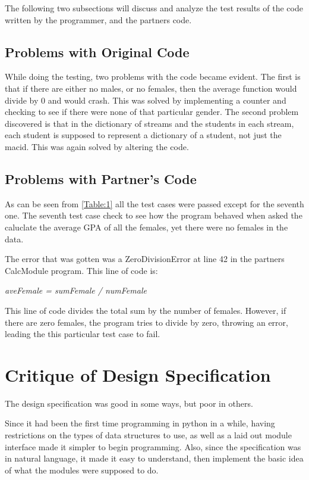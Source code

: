 \documentclass[12pt]{article}
\begin{document}
The following two subsections will discuss and analyze the test results of the code
written by the programmer, and the partners code.

\subsection{Problems with Original Code}

While doing the testing, two problems with the code became evident. The first is that
if there are either no males, or no females, then the average function would divide by 0
and would crash. This was solved by implementing a counter and checking to see if there were
none of that particular gender. The second problem discovered is that in the dictionary of streams
and the students in each stream, each student is supposed to represent a dictionary of a student,
not just the macid. This was again solved by altering the code.

\subsection{Problems with Partner's Code}

As can be seen from \ref{Table:1} all the test cases were passed except for the 
seventh one. The seventh test case check to see how the program behaved when
asked the caluclate the average GPA of all the females, yet there were no females
in the data.

The error that was gotten was a ZeroDivisionError at line 42 in the partners
CalcModule program. This line of code is:

\centerline{\textit{aveFemale = sumFemale / numFemale}}

This line of code divides the total sum by the number of females. However, if there
are zero females, the program tries to divide by zero, throwing an error, leading
the this particular test case to fail.

\section{Critique of Design Specification}

The design specification was good in some ways, but poor in others. 

Since it had been the first time programming in python in a while, having restrictions 
on the types of data structures to use, as well as a laid out module interface made it 
simpler to begin programming. Also, since the specification was in natural language, 
it made it easy to understand, then implement the basic idea of what the modules were 
supposed to do.
\end{document}
